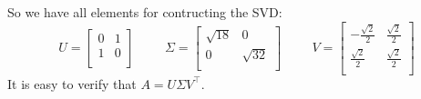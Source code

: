 So we have all elements for contructing the SVD:
\[
U = 
\begin{bmatrix}
    0 & 1\\
    1 & 0\\
\end{bmatrix}
\hspace{1cm}
\Sigma =
\begin{bmatrix}
    \sqrt{18} & 0\\
    0 & \sqrt{32}\\
\end{bmatrix}    
\hspace{1cm}
V =
\begin{bmatrix}
    -\frac{\sqrt{2}}{2} & \frac{\sqrt{2}}{2}\\
    \frac{\sqrt{2}}{2} & \frac{\sqrt{2}}{2}\\
\end{bmatrix}
\]
It is easy to verify that $A = U\Sigma V^\intercal$.

